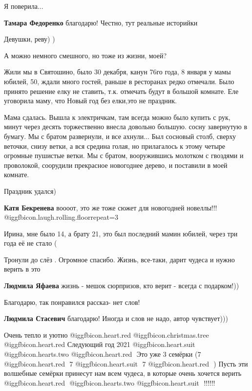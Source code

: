 \begin{itemize}
Я поверила...

\textbf{Тамара Федоренко} благодарю! Честно, тут реальные историйки


Девушки, реву) )

А можно немного смешного, но тоже из жизни, моей?

Жили мы в Святошино, было 30 декабря, канун 76го года, 8 января у мамы юбилей,
50, ждали много гостей, раньше в ресторанах редко отмечали. Было принято
решение елку не ставить, т.к. отмечать будут в большой комнате. Еле уговорила
маму, что Новый год без елки,это не праздник.

Мама сдалась. Вышла к электричкам, там всегда можно было купить с рук, минут
через десять торжественно внесла довольно большую. сосну завернутую в бумагу.
Мы с братом развернули, и все ахнули... Был сосновый столб, сверху веточки,
снизу ветки, а вся средина голая, но прилагалось к этому четыре огромные
пушистые ветки. Мы с братом, вооружившись молотком с гвоздями и проволокой,
соорудили прекрасное новогоднее дерево, и поставили в моей комнате.

Праздник удался)

\begin{itemize} %
\textbf{Катя Бекренева} воооот, это же тоже сюжет для новогодней новеллы!!! @igg{fbicon.laugh.rolling.floor}{repeat=3} 

Ирина, мне было 14, а брату 21, это был последний мамин юбилей, через три года её не стало (
\end{itemize} %

Тронули до слёз . Огромное спасибо. Жизнь, все-таки, дарит чудеса и нужно верить в это

\begin{itemize} %
\textbf{Людмила Яфаева} жизнь - мешок сюрпризов, кто верит - всегда с подарком!))
\end{itemize} %

Благодарю, так понравился рассказ- нет слов!

\textbf{Людмила Стасевич} благодарю! Иногда и слов не надо, автор чувствует)))


Очень тепло и уютно @igg{fbicon.heart.red}  @igg{fbicon.christmas.tree}  @igg{fbicon.heart.red} ️ Следующий
год 2021 @igg{fbicon.heart.suit} ️  @igg{fbicon.hearts.two}
@igg{fbicon.heart.red} ️ Это уже 3 семёрки (7 @igg{fbicon.heart.red} ️ 7
@igg{fbicon.heart.suit} ️ 7 @igg{fbicon.heart.red} ️ ) Пусть эти волшебные
семёрки принесут нам всем чудеса, в которые очень хочется верить
@igg{fbicon.heart.red} ️  @igg{fbicon.hearts.two}  @igg{fbicon.heart.suit} ️
!!!!!!


\end{itemize}
